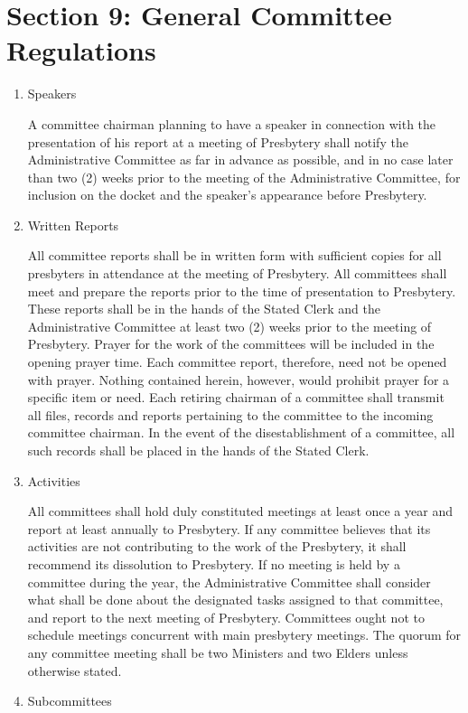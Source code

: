 \documentclass[
]{book}
\begin{document}
\hypertarget{section-9-general-committee-regulations}{%
\section*{Section 9: General Committee Regulations}\label{section-9-general-committee-regulations}}

\begin{enumerate}
\def\labelenumi{\Alph{enumi}.}
\item
  Speakers

  A committee chairman planning to have a speaker in connection with the presentation of his report at a meeting of Presbytery shall notify the Administrative Committee as far in advance as possible, and in no case later than two (2) weeks prior to the meeting of the Administrative Committee, for inclusion on the docket and the speaker's appearance before Presbytery.
\item
  Written Reports

  All committee reports shall be in written form with sufficient copies for all presbyters in attendance at the meeting of Presbytery. All committees shall meet and prepare the reports prior to the time of presentation to Presbytery. These reports shall be in the hands of the Stated Clerk and the Administrative Committee at least two (2) weeks prior to the meeting of Presbytery. Prayer for the work of the committees will be included in the opening prayer time. Each committee report, therefore, need not be opened with prayer. Nothing contained herein, however, would prohibit prayer for a specific item or need. Each retiring chairman of a committee shall transmit all files, records and reports pertaining to the committee to the incoming committee chairman. In the event of the disestablishment of a committee, all such records shall be placed in the hands of the Stated Clerk.
\item
  Activities

  All committees shall hold duly constituted meetings at least once a year and report at least annually to Presbytery. If any committee believes that its activities are not contributing to the work of the Presbytery, it shall recommend its dissolution to Presbytery. If no meeting is held by a committee during the year, the Administrative Committee shall consider what shall be done about the designated tasks assigned to that committee, and report to the next meeting of Presbytery. Committees ought not to schedule meetings concurrent with main presbytery meetings. The quorum for any committee meeting shall be two Ministers and two Elders unless otherwise stated.
\item
  Subcommittees


\end{enumerate}
\end{document}
